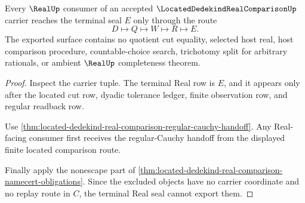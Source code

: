 \begin{theorem}
\label{thm:located-dedekind-real-comparison-real-seal-nonescape}
Every $\RealUp$ consumer of an accepted $\LocatedDedekindRealComparisonUp$ carrier reaches the terminal seal $E$ only through the route
$$
D \longmapsto Q \longmapsto W \longmapsto R \longmapsto E.
$$
The exported surface contains no quotient cut equality, selected host real, host comparison procedure, countable-choice search, trichotomy split for arbitrary rationals, or ambient $\RealUp$ completeness theorem.
\end{theorem}
\begin{proof}
Inspect the carrier tuple. The terminal Real row is $E$, and it appears only after the located cut row, dyadic tolerance ledger, finite observation row, and regular readback row.

Use \autoref{thm:located-dedekind-real-comparison-regular-cauchy-handoff}. Any Real-facing consumer first receives the regular-Cauchy handoff from the displayed finite located comparison route.

Finally apply the nonescape part of \autoref{thm:located-dedekind-real-comparison-namecert-obligations}. Since the excluded objects have no carrier coordinate and no replay route in $C$, the terminal Real seal cannot export them.
\end{proof}




